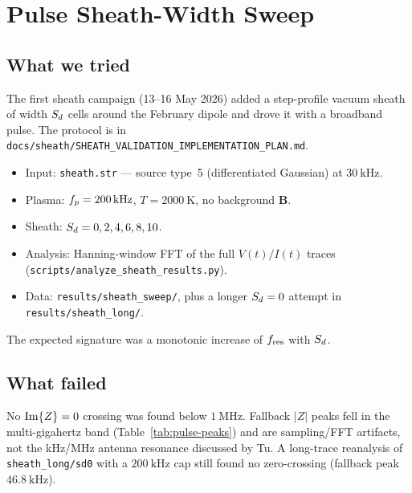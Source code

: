 \chapter{Pulse Sheath-Width Sweep}
\label{ch:pulse}

\section{What we tried}

The first sheath campaign (13--16 May 2026) added a step-profile vacuum sheath of width \(S_d\) cells around the February dipole and drove it with a broadband pulse. The protocol is in \texttt{docs/sheath/SHEATH\_VALIDATION\_IMPLEMENTATION\_PLAN.md}.

\begin{itemize}[leftmargin=1.5em]
\item Input: \texttt{sheath.str} --- source type~5 (differentiated Gaussian) at \(\SI{30}{\kilo\hertz}\).
\item Plasma: \(f_p=\SI{200}{\kilo\hertz}\), \(T=\SI{2000}{\kelvin}\), no background \(\mathbf{B}\).
\item Sheath: \(S_d=0,2,4,6,8,10\).
\item Analysis: Hanning-window FFT of the full \(V(t)/I(t)\) traces (\texttt{scripts/analyze\_sheath\_results.py}).
\item Data: \texttt{results/sheath\_sweep/}, plus a longer \(S_d=0\) attempt in \texttt{results/sheath\_long/}.
\end{itemize}

The expected signature was a monotonic increase of \(f_{\mathrm{res}}\) with \(S_d\).

\section{What failed}

No \(\operatorname{Im}\{Z\}=0\) crossing was found below \(\SI{1}{\mega\hertz}\). Fallback \(|Z|\) peaks fell in the multi-gigahertz band (Table~\ref{tab:pulse-peaks}) and are sampling/FFT artifacts, not the kHz/MHz antenna resonance discussed by Tu. A long-trace reanalysis of \texttt{sheath\_long/sd0} with a \(\SI{200}{\kilo\hertz}\) cap still found no zero-crossing (fallback peak \(\SI{46.8}{\kilo\hertz}\)).

